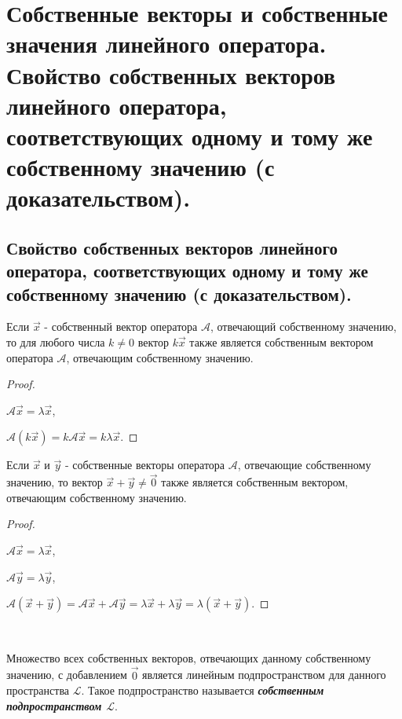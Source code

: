 \section{
    Собственные векторы и собственные значения линейного оператора. Свойство собственных векторов линейного оператора, соответствующих одному и тому же собственному значению (с доказательством).
}

\subsection{
    Свойство собственных векторов линейного оператора, соответствующих одному и тому же собственному значению (с доказательством).
}

Если $\vec{x}$ - собственный вектор оператора $\mathscr{A}$, отвечающий собственному значению, то для любого числа $k \ne 0$ вектор $k\vec{x}$ также является собственным вектором оператора $\mathscr{A}$, отвечающим собственному значению.

\begin{proof}~

    $\mathscr{A}\vec{x} = \lambda\vec{x}$,
    
    $\mathscr{A}(k\vec{x}) = k\mathscr{A}\vec{x} = k\lambda\vec{x}$.
\end{proof}

Если $\vec{x}$ и $\vec{y}$ - собственные векторы оператора $\mathscr{A}$, отвечающие собственному значению, то вектор $\vec{x} + \vec{y} \ne \vec{0}$ также является собственным вектором, отвечающим собственному значению.

\begin{proof}~

    $\mathscr{A}\vec{x} = \lambda\vec{x}$,
    
    $\mathscr{A}\vec{y} = \lambda\vec{y}$,
    
    $\mathscr{A}(\vec{x} + \vec{y}) = \mathscr{A}\vec{x} + \mathscr{A}\vec{y} = \lambda\vec{x} + \lambda\vec{y} = \lambda(\vec{x} + \vec{y})$.
\end{proof}

\begin{corollary}[свойство]~

    Множество всех собственных векторов, отвечающих данному собственному значению, с добавлением $\vec{0}$ является линейным подпространством для данного пространства $\mathcal{L}$. Такое подпространство называется \textbf{\textit{собственным подпространством $\mathcal{L}$}}.
\end{corollary}
